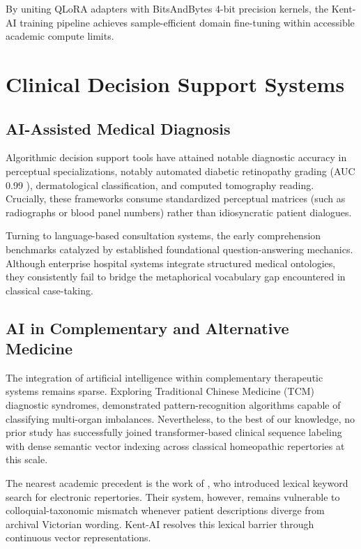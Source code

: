 By uniting QLoRA adapters with BitsAndBytes 4-bit precision kernels, the Kent-AI training pipeline achieves sample-efficient domain fine-tuning within accessible academic compute limits.


\section{Clinical Decision Support Systems}

\subsection{AI-Assisted Medical Diagnosis}

Algorithmic decision support tools have attained notable diagnostic accuracy in perceptual specializations, notably automated diabetic retinopathy grading (AUC 0.99 \cite{gulshan2016development}), dermatological classification, and computed tomography reading. Crucially, these frameworks consume standardized perceptual matrices (such as radiographs or blood panel numbers) rather than idiosyncratic patient dialogues.

Turning to language-based consultation systems, the early comprehension benchmarks catalyzed by \citeauthor{rajpurkar2016squad} \cite{rajpurkar2016squad} established foundational question-answering mechanics. Although enterprise hospital systems integrate structured medical ontologies, they consistently fail to bridge the metaphorical vocabulary gap encountered in classical case-taking.

\subsection{AI in Complementary and Alternative Medicine}

The integration of artificial intelligence within complementary therapeutic systems remains sparse. Exploring Traditional Chinese Medicine (TCM) diagnostic syndromes, \citeauthor{yuan2019study} \cite{yuan2019study} demonstrated pattern-recognition algorithms capable of classifying multi-organ imbalances. Nevertheless, to the best of our knowledge, no prior study has successfully joined transformer-based clinical sequence labeling with dense semantic vector indexing across classical homeopathic repertories at this scale.

The nearest academic precedent is the work of \citeauthor{mcsporran2020digital} \cite{mcsporran2020digital}, who introduced lexical keyword search for electronic repertories. Their system, however, remains vulnerable to colloquial-taxonomic mismatch whenever patient descriptions diverge from archival Victorian wording. Kent-AI resolves this lexical barrier through continuous vector representations.

